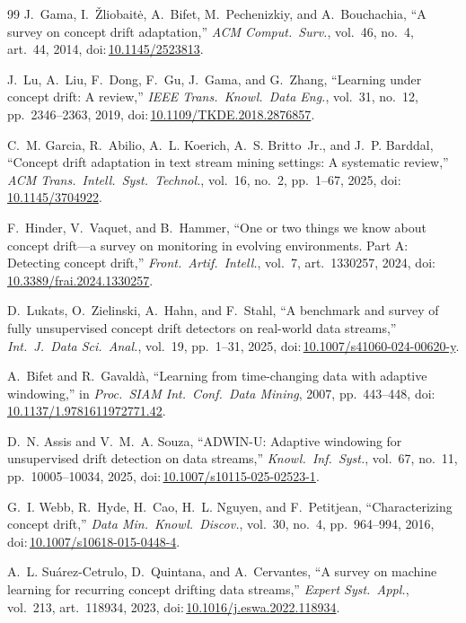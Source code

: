 \documentclass[conference]{IEEEtran}
\newcommand{\doi}[1]{doi:\,\url{#1}}
\begin{document}
\begin{thebibliography}{99}
 J.~Gama, I.~\v{Z}liobait\.{e}, A.~Bifet, M.~Pechenizkiy, and A.~Bouchachia, ``A survey on concept drift adaptation,'' \emph{ACM Comput.\ Surv.}, vol.~46, no.~4, art.~44, 2014, \doi{10.1145/2523813}.

 J.~Lu, A.~Liu, F.~Dong, F.~Gu, J.~Gama, and G.~Zhang, ``Learning under concept drift: A review,'' \emph{IEEE Trans.\ Knowl.\ Data Eng.}, vol.~31, no.~12, pp.~2346--2363, 2019, \doi{10.1109/TKDE.2018.2876857}.

 C.~M. Garcia, R.~Abilio, A.~L. Koerich, A.~S. Britto~Jr., and J.~P. Barddal, ``Concept drift adaptation in text stream mining settings: A systematic review,'' \emph{ACM Trans.\ Intell.\ Syst.\ Technol.}, vol.~16, no.~2, pp.~1--67, 2025, \doi{10.1145/3704922}.

 F.~Hinder, V.~Vaquet, and B.~Hammer, ``One or two things we know about concept drift---a survey on monitoring in evolving environments. Part A: Detecting concept drift,'' \emph{Front.\ Artif.\ Intell.}, vol.~7, art.~1330257, 2024, \doi{10.3389/frai.2024.1330257}.

 D.~Lukats, O.~Zielinski, A.~Hahn, and F.~Stahl, ``A benchmark and survey of fully unsupervised concept drift detectors on real-world data streams,'' \emph{Int.\ J.\ Data Sci.\ Anal.}, vol.~19, pp.~1--31, 2025, \doi{10.1007/s41060-024-00620-y}.

 A.~Bifet and R.~Gavald\`a, ``Learning from time-changing data with adaptive windowing,'' in \emph{Proc.\ SIAM Int.\ Conf.\ Data Mining}, 2007, pp.~443--448, \doi{10.1137/1.9781611972771.42}.

 D.~N. Assis and V.~M.~A. Souza, ``ADWIN-U: Adaptive windowing for unsupervised drift detection on data streams,'' \emph{Knowl.\ Inf.\ Syst.}, vol.~67, no.~11, pp.~10005--10034, 2025, \doi{10.1007/s10115-025-02523-1}.

 G.~I. Webb, R.~Hyde, H.~Cao, H.~L. Nguyen, and F.~Petitjean, ``Characterizing concept drift,'' \emph{Data Min.\ Knowl.\ Discov.}, vol.~30, no.~4, pp.~964--994, 2016, \doi{10.1007/s10618-015-0448-4}.

 A.~L. Su\'arez-Cetrulo, D.~Quintana, and A.~Cervantes, ``A survey on machine learning for recurring concept drifting data streams,'' \emph{Expert Syst.\ Appl.}, vol.~213, art.~118934, 2023, \doi{10.1016/j.eswa.2022.118934}.


\end{thebibliography}
\end{document}
